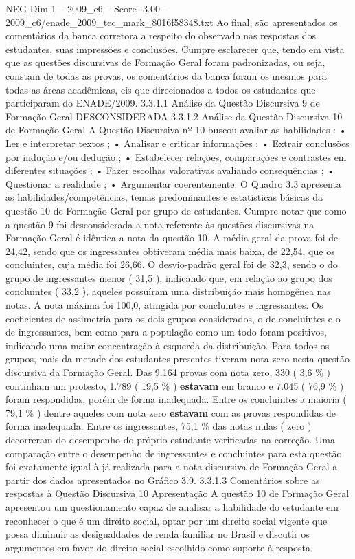 \begin{textsample}{NEG Dim 1 – 2009\_c6 – Score -3.00 – 2009\_c6/enade\_2009\_tec\_mark\_8016f58348.txt}
Ao final, são apresentados os comentários da banca corretora a respeito do observado nas respostas dos estudantes, suas impressões e conclusões.
Cumpre esclarecer que, tendo em vista que as questões discursivas de Formação Geral foram padronizadas, ou seja, constam de todas as provas, os comentários da banca foram os mesmos para todas as áreas acadêmicas, eis que direcionados a todos os estudantes que participaram do ENADE/2009. 3.3.1.1 Análise da Questão Discursiva 9 de Formação Geral DESCONSIDERADA 3.3.1.2 Análise da Questão Discursiva 10 de Formação Geral A Questão Discursiva nº 10 buscou avaliar as habilidades : • Ler e interpretar textos ; • Analisar e criticar informações ; • Extrair conclusões por indução e/ou dedução ; • Estabelecer relações, comparações e contrastes em diferentes situações ; • Fazer escolhas valorativas avaliando consequências ; • Questionar a realidade ; • Argumentar coerentemente.
O Quadro 3.3 apresenta as habilidades/competências, temas predominantes e estatísticas básicas da questão 10 de Formação Geral por grupo de estudantes.
Cumpre notar que como a questão 9 foi desconsiderada a nota referente às questões discursivas na Formação Geral é idêntica a nota da questão 10.
A média geral da prova foi de 24,42, sendo que os ingressantes obtiveram média mais baixa, de 22,54, que os concluintes, cuja média foi 26,66.
O desvio-padrão geral foi de 32,3, sendo o do grupo de ingressantes menor ( 31,5 ), indicando que, em relação ao grupo dos concluintes ( 33,2 ), aqueles possuíram uma distribuição mais homogênea nas notas.
A nota máxima foi 100,0, atingida por concluintes e ingressantes.
Os coeficientes de assimetria para os dois grupos considerados, o de concluintes e o de ingressantes, bem como para a população como um todo foram positivos, indicando uma maior concentração à esquerda da distribuição.
Para todos os grupos, mais da metade dos estudantes presentes tiveram nota zero nesta questão discursiva da Formação Geral.
Das 9.164 provas com nota zero, 330 ( 3,6 \% ) continham um protesto, 1.789 ( 19,5 \% ) \textbf{estavam} em branco e 7.045 ( 76,9 \% ) foram respondidas, porém de forma inadequada.
Entre os concluintes a maioria ( 79,1 \% ) dentre aqueles com nota zero \textbf{estavam} com as provas respondidas de forma inadequada.
Entre os ingressantes, 75,1 \% das notas nulas ( zero ) decorreram do desempenho do próprio estudante verificadas na correção.
Uma comparação entre o desempenho de ingressantes e concluintes para esta questão foi exatamente igual à já realizada para a nota discursiva de Formação Geral a partir dos dados apresentados no Gráfico 3.9. 3.3.1.3 Comentários sobre as respostas à Questão Discursiva 10 Apresentação A questão 10 de Formação Geral apresentou um questionamento capaz de analisar a habilidade do estudante em reconhecer o que é um direito social, optar por um direito social vigente que possa diminuir as desigualdades de renda familiar no Brasil e discutir os argumentos em favor do direito social escolhido como suporte à resposta.

\end{textsample}
